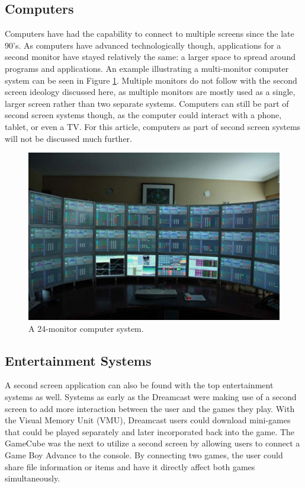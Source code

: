 \documentclass[11pt, oneside]{article}
\begin{document}
\subsection{Computers}
Computers have had the capability to connect to multiple screens since the late 90's. As computers have advanced technologically though, applications for a second monitor have stayed relatively the same: a larger space to spread around programs and applications. An example illustrating a multi-monitor computer system can be seen in Figure \ref{monitors}. Multiple monitors do not follow with the second screen ideology discussed here, as multiple monitors are mostly used as a single, larger screen rather than two separate systems. Computers can still be part of second screen systems though, as the computer could interact with a phone, tablet, or even a TV. For this article, computers as part of second screen systems will not be discussed much further.

\begin{figure}
    \centering
    \includegraphics[width=.8\textwidth]{Multiple-Monitor-Setup.jpg}
    \caption{A 24-monitor computer system.}
    \label{monitors}
\end{figure}

\subsection{Entertainment Systems}
A second screen application can also be found with the top entertainment systems as well. Systems as early as the Dreamcast were making use of a second screen to add more interaction between the user and the games they play. With the Visual Memory Unit (VMU), Dreamcast users could download mini-games that could be played separately and later incorporated back into the game. The GameCube was the next to utilize a second screen by allowing users to connect a Game Boy Advance to the console. By connecting two games, the user could share file information or items and have it directly affect both games simultaneously. 
\end{document}
